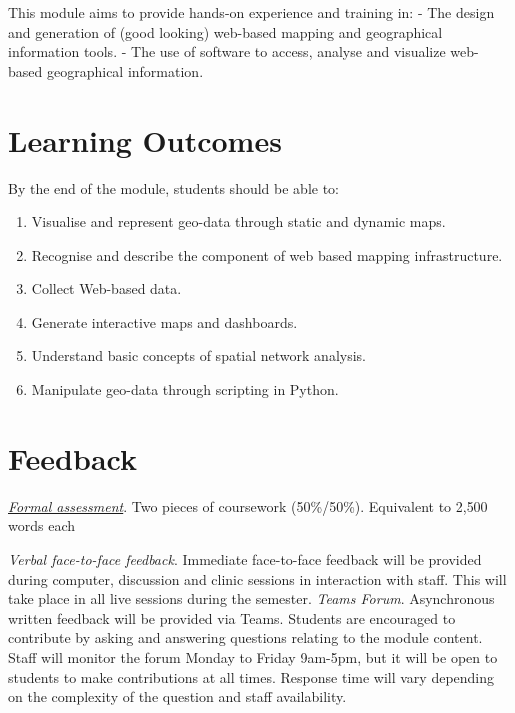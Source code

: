 \documentclass[
  letterpaper,
  DIV=11,
  numbers=noendperiod]{scrreprt}
\providecommand{\tightlist}{%
  \setlength{\itemsep}{0pt}\setlength{\parskip}{0pt}}\usepackage{longtable,booktabs,array}
\begin{document}

This module aims to provide hands-on experience and training in: - The
design and generation of (good looking) web-based mapping and
geographical information tools. - The use of software to access, analyse
and visualize web-based geographical information.

\section*{Learning Outcomes}\label{learning-outcomes}


By the end of the module, students should be able to:

\begin{enumerate}
\def\labelenumi{(\arabic{enumi})}
\setcounter{enumi}{1}
\tightlist
\item
  Visualise and represent geo-data through static and dynamic maps.
\item
  Recognise and describe the component of web based mapping
  infrastructure.
\item
  Collect Web-based data.
\item
  Generate interactive maps and dashboards.
\item
  Understand basic concepts of spatial network analysis.
\item
  Manipulate geo-data through scripting in Python.
\end{enumerate}

\section*{Feedback}\label{feedback}


\href{https://gdsl-ul.github.io/wma/assess.html}{\emph{Formal
assessment}}. Two pieces of coursework (50\%/50\%). Equivalent to 2,500
words each

\emph{Verbal face-to-face feedback}. Immediate face-to-face feedback
will be provided during computer, discussion and clinic sessions in
interaction with staff. This will take place in all live sessions during
the semester. \emph{Teams Forum}. Asynchronous written feedback will be
provided via Teams. Students are encouraged to contribute by asking and
answering questions relating to the module content. Staff will monitor
the forum Monday to Friday 9am-5pm, but it will be open to students to
make contributions at all times. Response time will vary depending on
the complexity of the question and staff availability.
\end{document}
